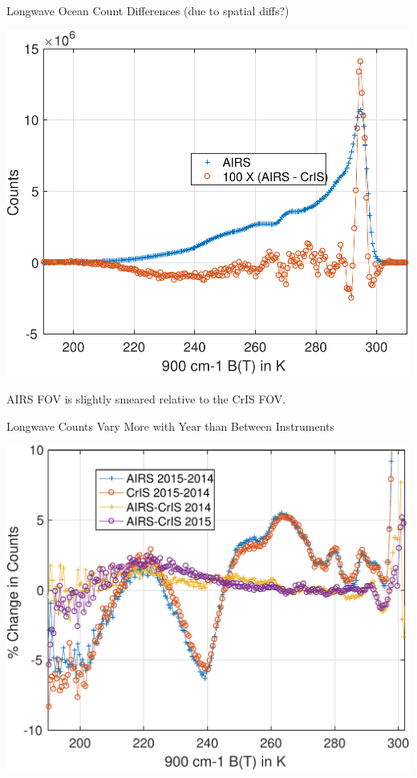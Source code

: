 \documentclass[10pt,t]{beamer}
\begin{document}
\begin{frame}[label={sec:orgaa004ae}]{Longwave Ocean Count Differences (due to spatial diffs?)}
\begin{center}
\includegraphics[width=0.7\linewidth]{./Figs/Pdf/ocean_linear_pdf_and_diff.pdf}
\end{center}
\vspace{-0.15in}
\small
AIRS FOV is slightly smeared relative to the CrIS FOV.
\end{frame}

\begin{frame}[label={sec:orgf21917b}]{Longwave Counts Vary More with Year than Between Instruments}
\begin{center}
\includegraphics[width=0.8\linewidth]{./Figs/Pdf/ocean_percent_count_changes.pdf}
\end{center}
\end{frame}
\end{document}
